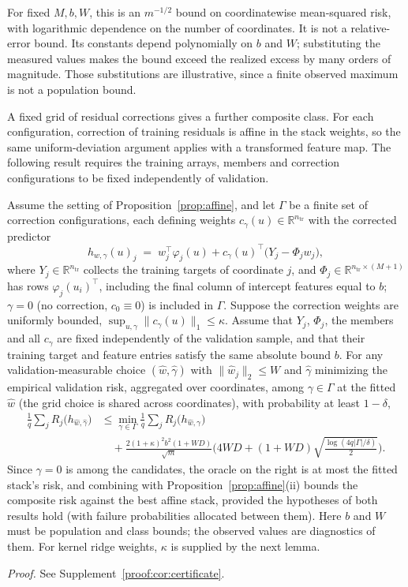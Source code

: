 For fixed $M,b,W$, this is an $m^{-1/2}$ bound on coordinatewise
mean-squared risk, with logarithmic dependence on the number of coordinates.
It is not a relative-error bound. Its constants depend polynomially on $b$
and $W$; substituting the measured values makes the bound exceed the realized
excess by many orders of magnitude. Those substitutions are illustrative,
since a finite observed maximum is not a population bound.

A fixed grid of residual corrections gives a further composite class. For
each configuration, correction of training residuals is affine in the stack
weights, so the same uniform-deviation argument applies with a transformed
feature map. The following result requires the training arrays, members and
correction configurations to be fixed independently of validation.

\begin{corollary}
\label{cor:certificate}
Assume the setting of Proposition~\ref{prop:affine}, and let $\Gamma$ be a
finite set of correction configurations, each defining weights
$c_\gamma(u)\in\mathbb R^{n_{\mathrm{tr}}}$ with the corrected predictor
\[
h_{w,\gamma}(u)_j\;=\;w_j^\top\varphi_j(u)
+c_\gamma(u)^\top\big(Y_j-\Phi_j w_j\big),
\]
where $Y_j\in\mathbb R^{n_{\mathrm{tr}}}$ collects the training targets of
coordinate $j$, and $\Phi_j\in\mathbb R^{n_{\mathrm{tr}}\times(M+1)}$
has rows $\varphi_j(u_i)^\top$, including the final column of intercept
features equal to $b$; $\gamma=0$
(no correction, $c_0\equiv0$) is included in $\Gamma$. Suppose the correction
weights are uniformly bounded, $\sup_{u,\gamma}\|c_\gamma(u)\|_1\le\kappa$.
Assume that $Y_j$, $\Phi_j$, the members and all $c_\gamma$ are fixed
independently of the validation sample, and that their training target and
feature entries satisfy the same absolute bound $b$. For any
validation-measurable choice
$(\widehat w,\widehat\gamma)$ with $\|\widehat w_j\|_2\le W$ and
$\widehat\gamma$ minimizing the empirical validation risk, aggregated over
coordinates, among $\gamma\in\Gamma$ at the fitted $\widehat w$ (the grid
choice is shared across coordinates), with
probability at least $1-\delta$,
\[
\begin{aligned}
\frac1q\sum_j R_j\big(h_{\widehat w,\widehat\gamma}\big)
&\le \min_{\gamma\in\Gamma}\frac1q\sum_j R_j\big(h_{\widehat w,\gamma}\big)\\
&\quad+\frac{2(1+\kappa)^2 b^2(1+WD)}{\sqrt m}
\Bigg(4WD+(1+WD)\sqrt{\frac{\log(4q|\Gamma|/\delta)}{2}}\Bigg).
\end{aligned}
\]
Since $\gamma=0$ is among the candidates, the oracle on the right is at most
the fitted stack's risk, and combining with
Proposition~\ref{prop:affine}(ii) bounds the composite risk against the best
affine stack, provided the hypotheses of both results hold (with failure
probabilities allocated between them). Here $b$ and $W$ must be population
and class bounds; the observed values are
diagnostics of them. For
kernel ridge weights, $\kappa$ is supplied by the next lemma.
\end{corollary}
\noindent\emph{Proof.} See Supplement~\ref{proof:cor:certificate}.


